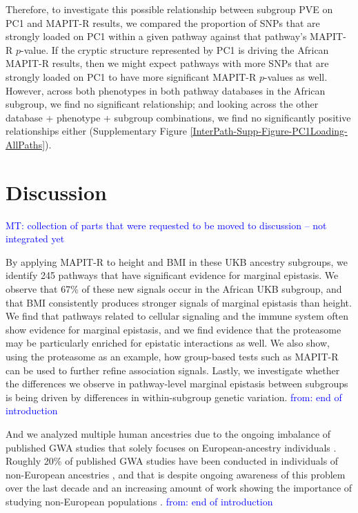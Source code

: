 \documentclass[12pt,a4paper]{article}
\begin{document}
Therefore, to investigate this possible relationship between subgroup PVE on PC1 and MAPIT-R results, we compared the proportion of SNPs that are strongly loaded on PC1 within a given pathway against that pathway's MAPIT-R $p$-value. If the cryptic structure represented by PC1 is driving the African MAPIT-R results, then we might expect pathways with more SNPs that are strongly loaded on PC1 to have more significant MAPIT-R $p$-values as well. However, across both phenotypes in both pathway databases in the African subgroup, we find no significant relationship; and looking across the other database + phenotype + subgroup combinations, we find no significantly positive relationships either (Supplementary Figure \ref{InterPath-Supp-Figure-PC1Loading-AllPaths}). 

\section{Discussion}\label{InterPath-Discussion}





\textcolor{blue}{MT: collection of parts that were requested to be moved to discussion -- not integrated yet}

By applying MAPIT-R to height and BMI in these UKB ancestry subgroups, we identify 245 pathways that have significant evidence for marginal epistasis. We observe that 67\% of these new signals occur in the African UKB subgroup, and that BMI consistently produces stronger signals of marginal epistasis than height. We find that pathways related to cellular signaling and the immune system often show evidence for marginal epistasis, and we find evidence that the proteasome may be particularly enriched for epistatic interactions as well. We also show, using the proteasome as an example, how group-based tests such as MAPIT-R can be used to further refine association signals. Lastly, we investigate whether the differences we observe in pathway-level marginal epistasis between subgroups is being driven by differences in within-subgroup genetic variation. \textcolor{blue}{from: end of introduction }

And we analyzed multiple human ancestries due to the ongoing imbalance of published GWA studies that solely focuses on European-ancestry individuals \citep{Need2009,Popejoy2016,Gurdasani2019,Martin2019,Sirugo2019}. Roughly 20\% of published GWA studies have been conducted in individuals of non-European ancestries \citep{Gurdasani2019,Martin2019,Sirugo2019}, and that is despite ongoing awareness of this problem over the last decade \citep{Need2009,Popejoy2016} and an increasing amount of work showing the importance of studying non-European populations \citep{Dumitrescu2011,Martin2017a,Martin2017b,Mogil2018,Bien2019,Duncan2019,Kuchenbaecker2019,Wojcik2019,Zhong2019,Marnetto2020,Mostafavi2020}. \textcolor{blue}{from: end of introduction }
\end{document}
